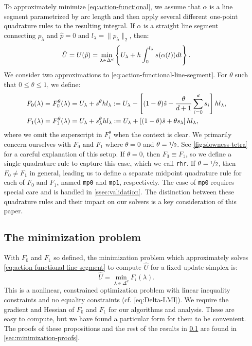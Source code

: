 \documentclass[sisc-eikonal.tex]{subfiles}
\begin{document}
To approximately minimize \cref{eq:action-functional}, we assume that
$\alpha$ is a line segment parametrized by arc length and then apply
several different one-point quadrature rules to the resulting
integral. If $\alpha$ is a straight line segment connecting
$p_\lambda$ and $\hat{p} = 0$ and $l_\lambda = \|p_\lambda\|_2$, then:
\begin{equation}
  \label{eq:action-functional-line-segment}
  \hat{U} = U(\hat{p}) = \min_{\lambda \in \Delta^d} \set{U_\lambda + h \int_0^{l_\lambda} s(\alpha(t))dt}.
\end{equation}
We consider two approximations to
\cref{eq:action-functional-line-segment}. For $\theta$ such that
$0 \leq \theta \leq 1$, we define:
\begin{align}
  F_0(\lambda) = F_0^\theta(\lambda) &= U_\lambda + s^{\theta} h l_\lambda := U_\lambda + \squareb{(1-\theta)\hat{s} + \frac{\theta}{d + 1} \sum_{i=0}^d s_i} h l_\lambda, \label{eq:f0-definition} \\
  F_1(\lambda) = F_1^\theta(\lambda) &= U_\lambda + s^{\theta}_\lambda h l_\lambda := U_\lambda + \squareb{(1-\theta)\hat{s} + \theta s_\lambda} h l_\lambda,
\end{align}
where we omit the superscript in $F_i^\theta$ when the context is
clear. We primarily concern ourselves with $F_0$ and $F_1$ where
$\theta = 0$ and $\theta = \nicefrac{1}{2}$. See
\cref{fig:slowness-tetra} for a careful explanation of this setup. If
$\theta = 0$, then $F_0 \equiv F_1$, so we define a single quadrature
rule to capture this case, which we call \texttt{rhr}. If
$\theta = \nicefrac{1}{2}$, then $F_0 \neq F_1$ in general, leading us
to define a separate midpoint quadrature rule for each of $F_0$ and
$F_1$, named \texttt{mp0} and \texttt{mp1}, respectively. The case of
\texttt{mp0} requires special care and is handled in
\cref{ssec:validation}. The distinction between these quadrature rules
and their impact on our solvers is a key consideration of this paper.

\subsection{The minimization problem}\label{ssec:minimization-problem}

With $F_0$ and $F_1$ so defined, the minimization problem which
approximately solves \cref{eq:action-functional-line-segment} to
compute $\hat{U}$ for a fixed update simplex is:
\begin{equation}
  \label{eq:constrained-minimization}
  \hat{U} = \min_{\lambda \in \Delta^d} F_i(\lambda).
\end{equation}
This is a nonlinear, constrained optimization problem with linear
inequality constraints and no equality constraints (cf.\@
\cref{eq:Delta-LMI}). We require the gradient and Hessian of $F_0$ and
$F_1$ for our algorithms and analysis. These are easy to compute, but
we have found a particular form for them to be convenient. The proofs
of these propositions and the rest of the results in
\cref{ssec:minimization-problem} are found in
\cref{sec:minimization-proofs}.
\end{document}
